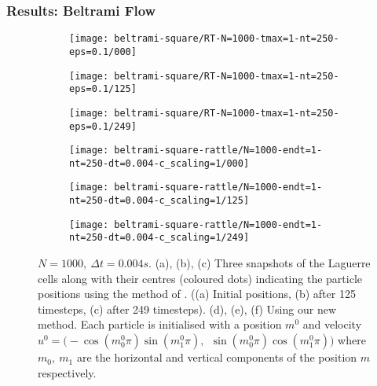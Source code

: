 \documentclass[10pt]{beamer}
\newcommand{\dt}{\Delta t}
\begin{document}
\frame
{
  \frametitle{Results: Beltrami Flow}

\begin{figure}[H]
     \begin{subfigure}[t]{0.25\textwidth}
        \centering
        \texttt{[image: beltrami-square/RT-N=1000-tmax=1-nt=250-eps=0.1/000]}
        \caption{} \label{fig:beltrami-flow-000-q}
    \end{subfigure}
    \begin{subfigure}[t]{0.25\textwidth}
        \centering
        \texttt{[image: beltrami-square/RT-N=1000-tmax=1-nt=250-eps=0.1/125]}
        \caption{} \label{fig:beltrami-flow-125-q}
    \end{subfigure}
   \begin{subfigure}[t]{0.25\textwidth}
        \centering
	\texttt{[image: beltrami-square/RT-N=1000-tmax=1-nt=250-eps=0.1/249]}
        \caption{} \label{fig:beltrami-flow-249-q}
    \end{subfigure}
   \begin{subfigure}[t]{0.25\textwidth}
        \centering
        \texttt{[image: beltrami-square-rattle/N=1000-endt=1-nt=250-dt=0.004-c\_scaling=1/000]}
        \caption{} \label{fig:beltrami-flow-000}
    \end{subfigure}
   \begin{subfigure}[t]{0.25\textwidth}
        \centering
        \texttt{[image: beltrami-square-rattle/N=1000-endt=1-nt=250-dt=0.004-c\_scaling=1/125]}
        \caption{} \label{fig:beltrami-flow-125}
    \end{subfigure}
   \begin{subfigure}[t]{0.25\textwidth}
        \centering
	\texttt{[image: beltrami-square-rattle/N=1000-endt=1-nt=250-dt=0.004-c\_scaling=1/249]}
        \caption{} \label{fig:beltrami-flow-249}
    \end{subfigure}
\centering
\caption{\(N = 1000, \: \dt = 0.004s\). (a), (b), (c) Three snapshots of the Laguerre cells along with their centres (coloured dots) indicating the particle positions using the method of \cite{gallouet2016lagrangian}. ((a) Initial positions, (b) after 125 timesteps, (c) after 249 timesteps). (d), (e), (f) Using our new method. Each particle is initialised with a position \(m^0\) and velocity \(u^0 = \big( -\cos(m^0_0 \pi) \sin(m^0_1 \pi), \: \: \sin(m^0_0 \pi) \cos(m^0_1 \pi) \big) \) where \(m_0, \: m_1\) are the horizontal and vertical components of the position \(m\) respectively.}
\centering
\label{fig:beltrami-flow}
\end{figure}

}
\end{document}
